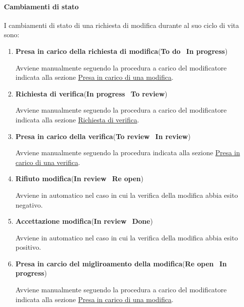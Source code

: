 \paragraph{Cambiamenti di stato}
I cambiamenti di stato di una richiesta di modifica durante al suo ciclo di vita sono:
\begin{enumerate}
    \item \textbf{Presa in carico della richiesta di modifica}(\textbf{To do} \textrightarrow\ \textbf{In progress})
    
    Avviene manualmente seguendo la procedura a carico del modificatore indicata alla sezione \hyperref[subpar:presa_carico_modifica]{Presa in carico di una modifica}.
    
    \item \textbf{Richiesta di verifica}(\textbf{In progress} \textrightarrow\ \textbf{To review})
    
    Avviene manualmente seguendo la procedura a carico del modificatore indicata alla sezione \hyperref[subpar:github_richiesta_di_verifica]{Richiesta di verifica}.
    
    \item \textbf{Presa in carico della verifica}(\textbf{To review} \textrightarrow\ \textbf{In review})
    
    Avviene manualmente seguendo la procedura indicata alla sezione \hyperref[subpar:presa_carico_verifica]{Presa in carico di una verifica}.
    
    \item  \textbf{Rifiuto modifica}(\textbf{In review} \textrightarrow\ \textbf{Re open})
    
    Avviene in automatico nel caso in cui la verifica della modifica abbia esito negativo.
    
    \item \textbf{Accettazione modifica}(\textbf{In review} \textrightarrow\ \textbf{Done})
    
    Avviene in automatico nel caso in cui la verifica della modifica abbia esito positivo.
    
    \item \textbf{Presa in carcio del migliroamento della modifica}(\textbf{Re open} \textrightarrow\ \textbf{In progress})
    
    Avviene manualmente seguendo la procedura a carico del modificatore indicata alla sezione \hyperref[subpar:presa_carico_modifica]{Presa in carico di una modifica}.
\end{enumerate}

